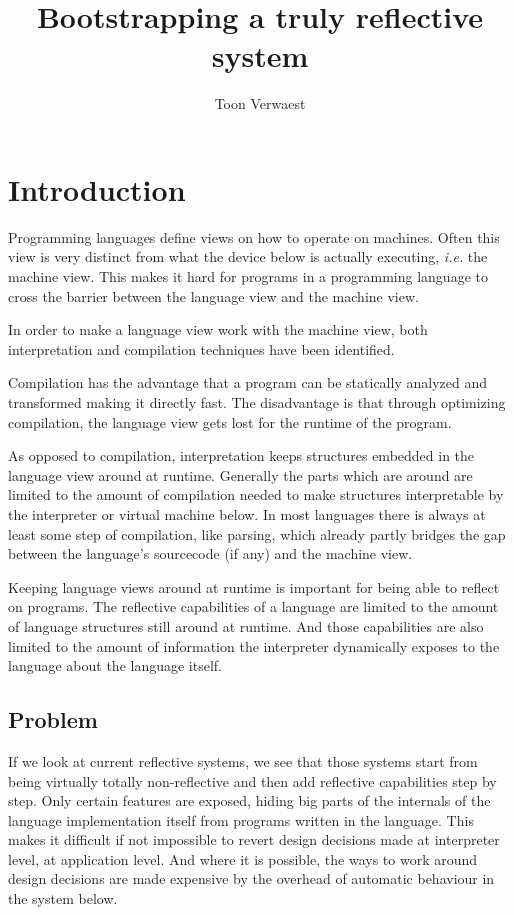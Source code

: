 \documentclass{article}
\title{Bootstrapping a truly reflective system}
\author{Toon Verwaest}
\newcommand{\ie}{\emph{i.e.}\xspace}
\begin{document}
\maketitle

\section{Introduction}

Programming languages define views on how to operate on machines.
Often this view is very distinct from what the device below is
actually executing, \ie the machine view. This makes it hard for
programs in a programming language to cross the barrier between
the language view and the machine view.

In order to make a language view work with the machine view, both
interpretation and compilation techniques have been identified.

Compilation has the advantage that a program can be statically
analyzed and transformed making it directly fast. The disadvantage is
that through optimizing compilation, the language view gets lost for
the runtime of the program. 

As opposed to compilation, interpretation keeps structures embedded in
the language view around at runtime. Generally the parts which are
around are limited to the amount of compilation needed to make
structures interpretable by the interpreter or virtual machine below.
In most languages there is always at least some step of compilation,
like parsing, which already partly bridges the gap between the
language's sourcecode (if any) and the machine view.

Keeping language views around at runtime is important for being able
to reflect on programs. The reflective capabilities of a language
are limited to the amount of language structures still around at
runtime. And those capabilities are also limited to the amount of
information the interpreter dynamically exposes to the language
about the language itself.

\subsection{Problem}
If we look at current reflective systems, we see that those systems
start from being virtually totally non-reflective and then add
reflective capabilities step by step. Only certain features are
exposed, hiding big parts of the internals of the language
implementation itself from programs written in the language. This
makes it difficult if not impossible to revert design decisions made
at interpreter level, at application level. And where it is possible,
the ways to work around design decisions are made expensive by the
overhead of automatic behaviour in the system below.
\end{document}
